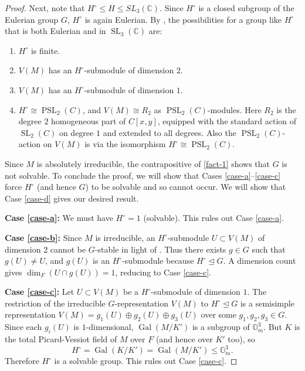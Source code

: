 \documentclass[11pt,reqno]{amsart}
\theoremstyle{definition}
\DeclareMathOperator{\SL}{SL}
\DeclareMathOperator{\PSL}{PSL}
\DeclareMathOperator{\Gal}{Gal}
\begin{document}
\begin{proof}
Next, note that $H^\circ \le H\le SL_3(\mathbb{C})$. Since $H^\circ$ is a closed subgroup of the Eulerian group $G$, $H^\circ$ is again Eulerian. By \cite[Proposition 4.1]{singer1985solving}, the possibilities for a group like $H^{\circ}$ that is both Eulerian and in $\SL_{3}(\mathbb{C})$ are:
\begin{enumerate}[label=(\alph*)]
    \item\label{case-a} $H^{\circ}$ is finite.
    \item\label{case-b} $V(M)$ has an $H^{\circ}$-submodule of dimension $2$.
    \item\label{case-c} $V(M)$ has an $H^{\circ}$-submodule of dimension $1$.
    \item\label{case-d} $H^{\circ}\cong \PSL_{2}(C)$, and $V(M)\cong R_{2}$ as $\PSL_{2}(C)$-modules. Here $R_{2}$ is the degree $2$ homogeneous part of $C[x,y]$, equipped with the standard action of $\SL_2(C)$ on degree $1$ and extended to all degrees. Also the $\PSL_{2}(C)$-action on $V(M)$ is via the isomorphism $H^{\circ}\cong \PSL_{2}(C)$.
\end{enumerate}

Since $M$ is absolutely irreducible, the contrapositive of \eqref{fact-1} shows that $G$ is not solvable.
To conclude the proof, we will show that Cases \ref{case-a}--\ref{case-c} force $H^{\circ}$ (and hence $G$) to be solvable and so cannot occur. 
We will show that Case \ref{case-d} gives our desired result.

\textbf{Case \ref{case-a}:}
We must have $H^{\circ}=1$ (solvable). This rules out Case \ref{case-a}.

\textbf{Case \ref{case-b}:}
Since $M$ is irreducible, an $H^{\circ}$-submodule $U\subset V(M)$ of dimension $2$ cannot be $G$-stable in light of . 
Thus there exists $g\in G$ such that $g(U)\neq U$, and $g(U)$ is an $H^{\circ}$-submodule because $H^{\circ}\trianglelefteq G$. A dimension count gives $\dim_{F}(U\cap g(U))=1$, reducing to Case \ref{case-c}.

\textbf{Case \ref{case-c}:}
Let $U\subset V(M)$ be a $H^{\circ}$-submodule of dimension $1$.
The restriction of the irreducible $G$-representation $V(M)$ to $H^{\circ}\trianglelefteq G$ is a semisimple representation $V(M)=g_1(U)\oplus g_2(U)\oplus g_3(U)$ over some $g_1,g_2,g_3\in G$. 
Since each $g_i(U)$ is $1$-dimensional, $\Gal(M/K')$ is a subgroup of
$\mathbb{G}_{m}^{3}$. But $K$ is the total Picard-Vessiot field of $M$ over $F$ (and hence over $K'$ too), so 
$$H^{\circ}=\Gal(K/K')=\Gal(M/K')\le \mathbb{G}_{m}^{3}.$$
Therefore $H^{\circ}$ is a solvable group. This rules out Case \ref{case-c}.


\end{proof}
\end{document}
